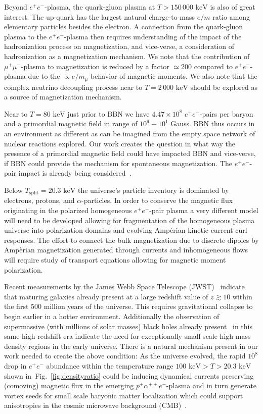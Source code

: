 \documentclass[aps,prd,floatfix,reprint]{revtex4-2}
\newcommand*{\keV}{\text{ keV}}
\newcommand{\rf}[1]{Fig.~{\ref{#1}}}
\begin{document}
Beyond $e^{+}e^{-}$-plasma, the quark-gluon plasma at $T>150\,000\keV$ is also of great interest. The up-quark has the largest natural charge-to-mass $e/m$ ratio among elementary particles besides the electron. A connection from the quark-gluon plasma to the $e^{+}e^{-}$-plasma then requires understanding of the impact of the hadronization process on magnetization, and vice-verse, a consideration of hadronization as a magnetization mechanism. We note that the contribution of $\mu^{+}\mu^{-}$-plasma to magnetization is reduced by a factor $\simeq 200$ compared to $e^{+}e^{-}$-plasma due to the $\propto e/m_{\mu}$ behavior of magnetic moments. We also note that the complex neutrino decoupling process near to $T=2\,000\keV$ should be explored as a source of magnetization mechanism.
 
Near to $T=80\keV$ just prior to BBN we have $4.47\times10^{8}$ $e^{+}e^{-}$-pairs per baryon and a primordial magnetic field in range of $10^{9}-10^{1}$ Gauss. BBN thus occurs in an environment as different as can be imagined from the empty space network of nuclear reactions explored. Our work creates the question in what way the presence of a primordial magnetic field could have impacted BBN and vice-verse, if BBN could provide the mechanism for spontaneous magnetization. The $e^{+}e^{-}$-pair impact is already being considered~\cite{Grayson:2023flr}.

Below $T_\mathrm{split}=20.3\keV$ the universe's particle inventory is dominated by electrons, protons, and $\alpha$-particles. In order to conserve the magnetic flux originating in the polarized homogeneous $e^{+}e^{-}$-pair plasma a very different model will need to be developed allowing for fragmentation of the homogeneous plasma universe into polarization domains and evolving Amp{\`e}rian kinetic current curl responses. The effort to connect the bulk magnetization due to discrete dipoles by Amp{\`e}rian magnetization generated through currents and inhomogeneous flows will require study of transport equations allowing for magnetic moment polarization. 

Recent measurements by the James Webb Space Telescope (JWST)~\cite{Yan:2022sxd,adams2023discovery,arrabal2023spectroscopic} indicate that maturing galaxies already present at a large redshift value of $z\gtrsim10$ within the first 500 million years of the universe. This requires gravitational collapse to begin earlier in a hotter environment. Additionally the observation of supermassive (with millions of solar masses) black holes already present~\cite{CEERSTeam:2023qgy} in this same high redshift era indicate the need for exceptionally small-scale high mass density regions in the early universe. There is a natural mechanism present in our work needed to create the above condition: As the universe evolved, the rapid $10^{8}$ drop in $e^{+}e^{-}$ abundance within the temperature range $100\keV>T>20.3\keV$ shown in~\rf{fig:densityratio} could be inducing dynamical currents preserving (comoving) magnetic flux in the emerging $p^{+}\alpha^{++}e^{-}$-plasma and in turn generate vortex seeds for small scale baryonic matter localization which could support anisotropies in the cosmic microwave background (CMB)~\cite{Jedamzik:2013gua,Abdalla:2022yfr}.
\end{document}
